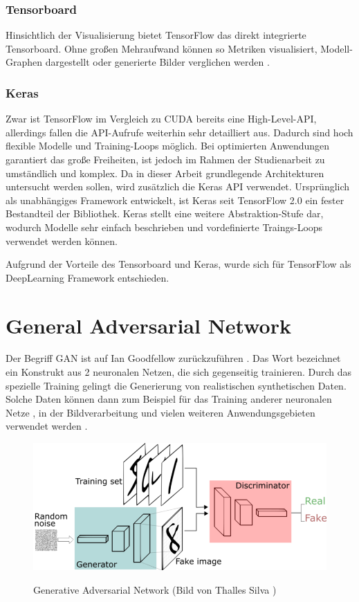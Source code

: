 \subsubsection{Tensorboard}
Hinsichtlich der Visualisierung bietet TensorFlow das direkt integrierte Tensorboard.
Ohne großen Mehraufwand können so Metriken visualisiert, Modell-Graphen dargestellt oder generierte Bilder verglichen werden \cite{tensorboard}.

\subsubsection{Keras}
Zwar ist TensorFlow im Vergleich zu CUDA bereits eine High-Level-API, allerdings fallen die API-Aufrufe weiterhin sehr detailliert aus.
Dadurch sind hoch flexible Modelle und Training-Loops möglich.
Bei optimierten Anwendungen garantiert das große Freiheiten, ist jedoch im Rahmen der Studienarbeit zu umständlich und komplex.
Da in dieser Arbeit grundlegende Architekturen untersucht werden sollen, wird zusätzlich die Keras API \cite{keras} verwendet.
Ursprünglich als unabhängiges Framework entwickelt, ist Keras seit TensorFlow 2.0 ein fester Bestandteil der Bibliothek.
Keras stellt eine weitere Abstraktion-Stufe dar, wodurch Modelle sehr einfach beschrieben und vordefinierte Traings-Loops verwendet werden können.
\newline

Aufgrund der Vorteile des Tensorboard und Keras, wurde sich für TensorFlow als DeepLearning Framework entschieden.

\section{General Adversarial Network}
Der Begriff \acrfull{GAN} ist auf Ian Goodfellow zurückzuführen \cite{gan-original-paper}.
Das Wort bezeichnet ein Konstrukt aus 2 neuronalen Netzen, die sich gegenseitig trainieren.
Durch das spezielle Training gelingt die Generierung von realistischen synthetischen Daten.
Solche Daten können dann zum Beispiel für das Training anderer neuronalen Netze \cite{gan-application-augmenting-training-data}, in der Bildverarbeitung \cite{gan-application-upscaling, gan-application-blending} und vielen weiteren Anwendungsgebieten verwendet werden \cite{gan-application-dna-optimizes-protein-functions, gan-application-audio-synthesis}.

\begin{figure}[H]
	\centering
	\includegraphics[width=12cm]{kapitel/2_stand_der_technik/img/GAN.png}
	\label{img:gan}
	\caption{Generative Adversarial Network (Bild von Thalles Silva \cite{img-gan})}
\end{figure}

